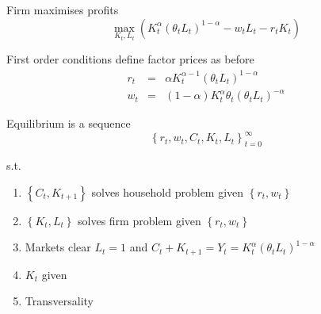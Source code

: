 \documentclass[notes=show]{beamer}
\begin{document}
\begin{frame}%


Firm maximises profits%
\begin{equation*}
\underset{K_{t},L_{t}}{\max }\left( K_{t}^{\alpha }\left( \theta
_{t}L_{t}\right) ^{1-\alpha }-w_{t}L_{t}-r_{t}K_{t}\right)
\end{equation*}

First order conditions define factor prices as before%
\begin{eqnarray*}
r_{t} &=&\alpha K_{t}^{\alpha -1}\left( \theta _{t}L_{t}\right) ^{1-\alpha }%
\text{ } \\
w_{t} &=&\left( 1-\alpha \right) K_{t}^{\alpha }\theta _{t}\left( \theta
_{t}L_{t}\right) ^{-\alpha }
\end{eqnarray*}

\transboxout%
\end{frame}%

\begin{frame}%


Equilibrium is a sequence 
\begin{equation*}
\left\{ r_{t},w_{t},C_{t},K_{t},L_{t}\right\} _{t=0}^{\infty }
\end{equation*}

s.t.

\begin{enumerate}
\item $\left\{ C_{t},K_{t+1}\right\} $ solves household problem given $%
\left\{ r_{t},w_{t}\right\} $

\item $\left\{ K_{t},L_{t}\right\} $ solves firm problem given $\left\{
r_{t},w_{t}\right\} $

\item Markets clear $L_{t}=1$ and $C_{t}+K_{t+1}=Y_{t}=K_{t}^{\alpha }\left(
\theta _{t}L_{t}\right) ^{1-\alpha }$

\item $K_{t}$ given

\item Transversality
\end{enumerate}

\transboxout%
\end{frame}%
\end{document}
